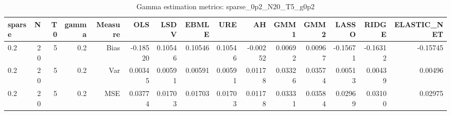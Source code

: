 \begin{table}[!htbp]\centering
\caption{Gamma estimation metrics: sparse_0p2_N20_T5_g0p2}
\label{tab:table1_sparse_0p2_N20_T5_g0p2}
\begin{tabular}{lrrrrrrrrrrrrrr}
\hline
sparse & N & T0 & gamma & Measure & OLS & LSDV & EBMLE & URE & AH & GMM1 & GMM2 & LASSO & RIDGE & ELASTIC_NET \\
\hline
0.2 & 20 & 5 & 0.2 & Bias & -0.18520 & 0.10546 & 0.10546 & 0.10546 & -0.00252 & 0.00692 & 0.00967 & -0.15671 & -0.16312 & -0.15745 \\
0.2 & 20 & 5 & 0.2 & Var & 0.00345 & 0.00591 & 0.00591 & 0.00591 & 0.01178 & 0.03326 & 0.03574 & 0.00513 & 0.00439 & 0.00496 \\
0.2 & 20 & 5 & 0.2 & MSE & 0.03774 & 0.01703 & 0.01703 & 0.01703 & 0.01178 & 0.03331 & 0.03584 & 0.02969 & 0.03100 & 0.02975 \\
\hline
\end{tabular}
\end{table}

